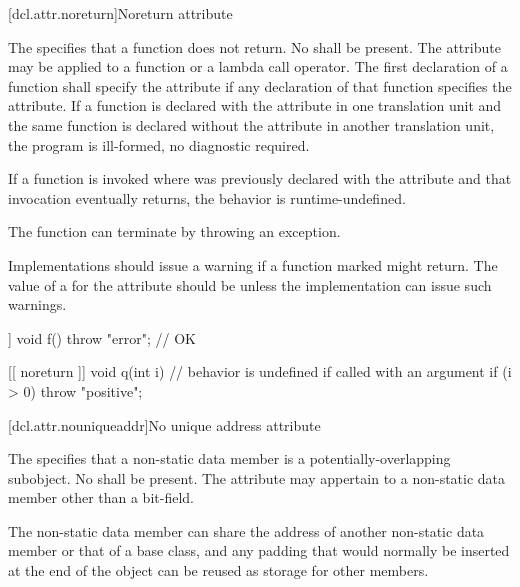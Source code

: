 [dcl.attr.noreturn]{Noreturn attribute}%

\pnum
The   specifies that a function does not return.
No  shall be present.
The attribute may be applied to a function or a lambda call operator.
The first declaration of a function shall
specify the  attribute if any declaration of that function specifies the
 attribute. If a function is declared with the  attribute in one
translation unit and the same function is declared without the  attribute in another
translation unit, the program is ill-formed, no diagnostic required.

\pnum
If a function  is invoked where  was previously declared with the 
attribute and that invocation eventually returns,
the behavior is runtime-undefined.
\begin{note}
The function can
terminate by throwing an exception.
\end{note}

\pnum
\recommended
Implementations should issue a
warning if a function marked \tcode{[[noreturn]]} might return.
The value of
a  for the  attribute
should be  unless the implementation can issue such warnings.

\pnum
\begin{example}
\begin{codeblock}
[[ noreturn ]] void f() {
  throw "error";                // OK
}

[[ noreturn ]] void q(int i) {  // behavior is undefined if called with an argument 
  if (i > 0)
    throw "positive";
}
\end{codeblock}
\end{example}

[dcl.attr.nouniqueaddr]{No unique address attribute}%

\pnum
The  
specifies that a non-static data member
is a potentially-overlapping subobject.
No  shall be present.
The attribute may appertain to a non-static data member
other than a bit-field.

\pnum
\begin{note}
The non-static data member can share the address of
another non-static data member or that of a base class,
and any padding that would normally be inserted
at the end of the object
can be reused as storage for other members.
\end{note}

